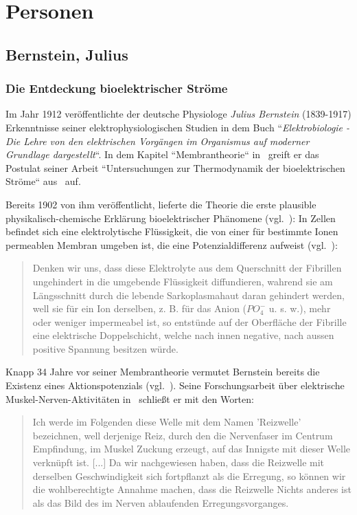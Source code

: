 \chapter{Personen}

\section{Bernstein, Julius}\label{appendix:bernstein}

\subsection*{Die Entdeckung bioelektrischer Ströme}

Im Jahr 1912 veröffentlichte der deutsche Physiologe \textit{Julius Bernstein} (1839-1917) Erkenntnisse seiner elektrophysiologischen Studien in dem Buch ``\textit{Elektrobiologie - Die Lehre von den elektrischen Vorgängen im Organismus auf moderner Grundlage dargestellt}``.
In dem Kapitel ``Membrantheorie`` in~\cite{Ber12} greift er das Postulat seiner Arbeit ``Untersuchungen zur Thermodynamik der bioelektrischen Ströme`` aus~\cite{Ber02} auf.

Bereits 1902 von ihm veröffentlicht, lieferte die Theorie die erste plausible physikalisch-chemische Erklärung bioelektrischer Phänomene (vgl.~\cite[5]{Sey06}): In Zellen befindet sich eine elektrolytische Flüssigkeit, die von einer für bestimmte Ionen permeablen Membran umgeben ist, die eine Potenzialdifferenz aufweist (vgl.~\cite[92 f.]{Ber12}):

\blockquote[{\cite[542]{Ber02}}]{
    Denken wir uns, dass diese Elektrolyte aus dem Querschnitt der Fibrillen ungehindert in die umgebende Flüssigkeit diffundieren, wahrend sie am Längsschnitt durch die lebende Sarkoplasmahaut daran gehindert werden, well sie für ein Ion derselben, z. B. für das Anion ($PO^-_4$ u. s. w.), mehr oder weniger impermeabel ist, so entstünde auf der Oberfläche der Fibrille eine elektrische Doppelschicht, welche nach innen negative, nach aussen positive Spannung besitzen würde.
}

Knapp 34 Jahre vor seiner Membrantheorie vermutet Bernstein bereits die Existenz eines Aktionspotenzials (vgl.~\cite[168]{Sch83}). Seine Forschungsarbeit über elektrische Muskel-Nerven-Aktivitäten in~\cite{Ber68} schließt er mit den Worten:

\blockquote[{\cite[198 f.]{Ber68}}]{
    Ich werde im Folgenden diese Welle mit dem Namen 'Reizwelle' bezeichnen, well derjenige Reiz, durch den die Nervenfaser im Centrum Empfindung, im Muskel Zuckung erzeugt, auf das  Innigste mit dieser Welle verknüpft ist. {[...]} Da wir nachgewiesen haben, dass die Reizwelle mit derselben Geschwindigkeit sich fortpflanzt als die Erregung, so können wir die wohlberechtigte Annahme machen, dass die Reizwelle Nichts anderes ist als das Bild des im Nerven ablaufenden Erregungsvorganges.
}

